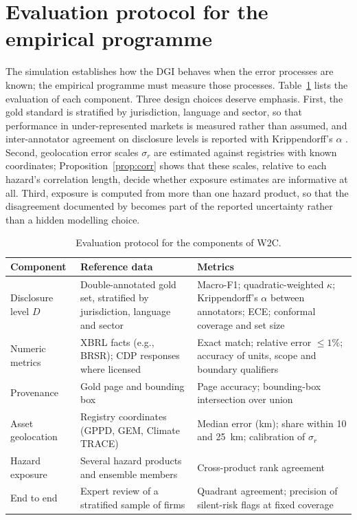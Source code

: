\documentclass{article}
\theoremstyle{plain}
\theoremstyle{definition}
\begin{document}
\section{Evaluation protocol for the empirical programme}
\label{sec:eval}

The simulation establishes how the DGI behaves when the error processes are known; the empirical programme must measure those processes. Table~\ref{tab:protocol} lists the evaluation of each component. Three design choices deserve emphasis. First, the gold standard is stratified by jurisdiction, language and sector, so that performance in under-represented markets is measured rather than assumed, and inter-annotator agreement on disclosure levels is reported with Krippendorff's $\alpha$ \citep{krippendorff2004content}. Second, geolocation error scales $\sigma_r$ are estimated against registries with known coordinates; Proposition~\ref{prop:corr} shows that these scales, relative to each hazard's correlation length, decide whether exposure estimates are informative at all. Third, exposure is computed from more than one hazard product, so that the disagreement documented by \citet{hain2022physical} becomes part of the reported uncertainty rather than a hidden modelling choice.

\begin{table}[t]
\caption{Evaluation protocol for the components of W2C.}
\label{tab:protocol}
\centering
\small
\begin{tabularx}{\textwidth}{@{}l>{\raggedright\arraybackslash}X>{\raggedright\arraybackslash}X@{}}
\toprule
Component & Reference data & Metrics \\
\midrule
Disclosure level $D$ & Double-annotated gold set, stratified by jurisdiction, language and sector & Macro-F1; quadratic-weighted $\kappa$; Krippendorff's $\alpha$ between annotators; ECE; conformal coverage and set size \\
Numeric metrics & XBRL facts (e.g., BRSR); CDP responses where licensed & Exact match; relative error $\leq 1\%$; accuracy of units, scope and boundary qualifiers \\
Provenance & Gold page and bounding box & Page accuracy; bounding-box intersection over union \\
Asset geolocation & Registry coordinates (GPPD, GEM, Climate TRACE) & Median error (km); share within 10 and 25~km; calibration of $\sigma_r$ \\
Hazard exposure & Several hazard products and ensemble members & Cross-product rank agreement \\
End to end & Expert review of a stratified sample of firms & Quadrant agreement; precision of silent-risk flags at fixed coverage \\
\bottomrule
\end{tabularx}
\end{table}
\end{document}
